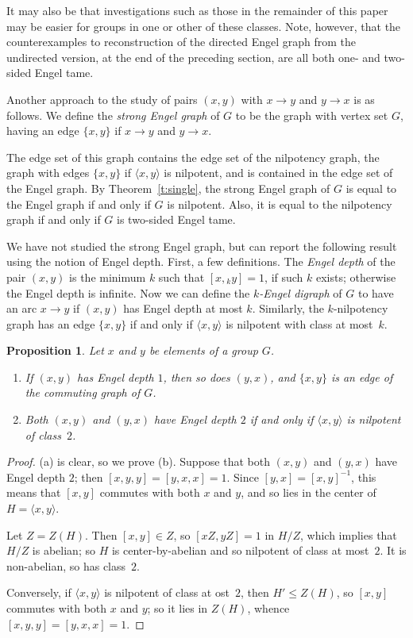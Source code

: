 \documentclass[reqno,12pt]{amsart}
\theoremstyle{plain}
\newtheorem{prop}[thm]{Proposition}
\theoremstyle{definition}
\begin{document}
It may also be that investigations such as those in the remainder of this paper
may  be easier for groups in one or other of these classes. Note, however, that
the counterexamples to reconstruction of the directed Engel graph from
the undirected version, at the end of the preceding section, are all both
one- and  two-sided Engel tame.

Another approach to the study of pairs $(x,y)$ with $x\to y$ and $y\to x$ is
as follows. We define the \emph{strong Engel graph} of $G$ to be the graph
with vertex set $G$, having an edge $\{x,y\}$ if $x\to y$ and $y\to x$.

The edge set of this graph contains the edge set of the nilpotency graph,
the graph with edges $\{x,y\}$ if $\langle x,y\rangle$ is nilpotent, and is
contained in the edge set of the Engel graph. By Theorem~\ref{t:single}, the
strong Engel graph of $G$ is equal to the Engel graph if and only if $G$
is nilpotent. Also, it is equal to the nilpotency graph if and only if $G$ is
two-sided Engel tame.

We have not studied the strong Engel graph, but can report the following
result using the notion of Engel depth. First, a few definitions.
The \emph{Engel depth} of the pair $(x,y)$ is the minimum $k$ such that
$[x,{}_ky]=1$, if such $k$ exists; otherwise the Engel depth is infinite. Now
we can define the \emph{$k$-Engel digraph} of $G$ to have an arc $x\to y$ if
$(x,y)$ has Engel depth at most $k$. Similarly, the $k$-nilpotency graph has
an edge $\{x,y\}$ if and only if $\langle x,y\rangle$ is nilpotent with class
at most~$k$.

\begin{prop}
Let $x$ and $y$ be elements of a group $G$.
\begin{enumerate}
\item If $(x,y)$ has Engel depth $1$, then so does $(y,x)$, and $\{x,y\}$ is
an edge of the commuting graph of $G$.
\item Both $(x,y)$ and $(y,x)$ have Engel depth $2$ if and only if
$\langle x,y\rangle$ is nilpotent of class~$2$.
\end{enumerate}
\end{prop}

\begin{proof}
(a) is clear, so we prove (b). Suppose that both $(x,y)$ and $(y,x)$ have
Engel depth $2$; then $[x,y,y]=[y,x,x]=1$. Since $[y,x]=[x,y]^{-1}$, this
means that $[x,y]$ commutes with both $x$ and $y$, and so lies in the center
of $H=\langle x,y\rangle$.

Let $Z=Z(H)$. Then $[x,y]\in Z$, so $[xZ,yZ]=1$ in $H/Z$, which implies that
$H/Z$ is abelian; so $H$ is center-by-abelian and so nilpotent of class at
most~$2$. It is non-abelian, so has class~$2$.

Conversely, if $\langle x,y\rangle$ is nilpotent of class at ost~$2$, then
$H'\le Z(H)$, so $[x,y]$ commutes with both $x$ and $y$; so it lies in $Z(H)$,
whence $[x,y,y]=[y,x,x]=1$.
\end{proof}
\end{document}
